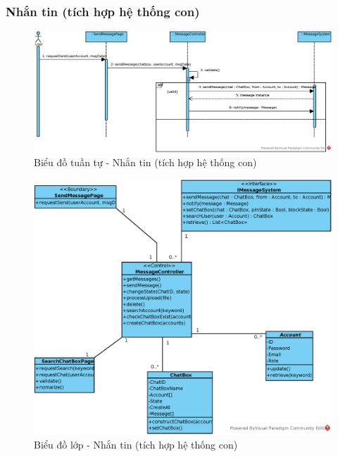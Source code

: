\documentclass[./../main.tex]{subfiles}
\begin{document}
\subsubsection{Nhắn tin (tích hợp hệ thống con)}
\begin{figure}[H]
    \centering
    \includegraphics[width=\linewidth]{./images/UseCaseDesignDiagram/ucr_ss_message.eps}
    \caption{Biểu đồ tuần tự - Nhắn tin (tích hợp hệ thống con)}
\end{figure}
\begin{figure}[H]
    \centering
    \includegraphics[width=\linewidth]{./images/UseCaseDesignDiagram/ucd_ss_message.eps}
    \caption{Biểu đồ lớp - Nhắn tin (tích hợp hệ thống con)}
\end{figure}
\end{document}
